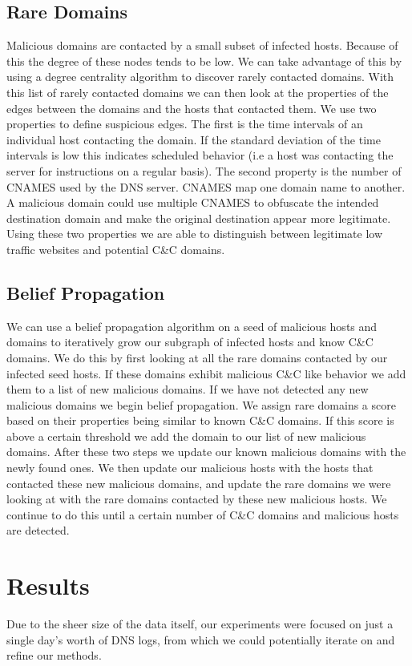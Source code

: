 \documentclass{article} %
\begin{document}
\subsection{Rare Domains}
Malicious domains are contacted by a small subset of infected hosts. Because of this the degree of these nodes tends to be low. We can take advantage of this by using a degree centrality algorithm to discover rarely contacted domains. With this list of rarely contacted domains we can then look at the properties of the edges between the domains and the hosts that contacted them. We use two properties to define suspicious edges. The first is the time intervals of an individual host contacting the domain. If the standard deviation of the time intervals is low this indicates scheduled behavior (i.e a host was contacting the server for instructions on a regular basis). The second property is the number of CNAMES used by the DNS server. CNAMES map one domain name to another. A malicious domain could use multiple CNAMES to obfuscate the intended destination domain and make the original destination appear more legitimate. Using these two properties we are able to distinguish between legitimate low traffic websites and potential C\&C domains.

\subsection{Belief Propagation}
We can use a belief propagation algorithm on a seed of malicious hosts and domains to iteratively grow our subgraph of infected hosts and know C\&C domains. We do this by first looking at all the rare domains contacted by our infected seed hosts. If these domains exhibit malicious C\&C like behavior we add them to a list of new malicious domains. If we have not detected any new malicious domains we begin belief propagation. We assign rare domains a score based on their properties being similar to known C\&C domains. If this score is above a certain threshold we add the domain to our list of new malicious domains. After these two steps we update our known malicious domains with the newly found ones. We then update our malicious hosts with the hosts that contacted these new malicious domains, and update the rare domains we were looking at with the rare domains contacted by these new malicious hosts. We continue to do this until a certain number of C\&C domains and malicious hosts are detected.


\section{Results}
\label{res}
Due to the sheer size of the data itself, our experiments were focused on just a single day's worth of DNS logs, from which we could potentially iterate on and refine our methods.
\end{document}
